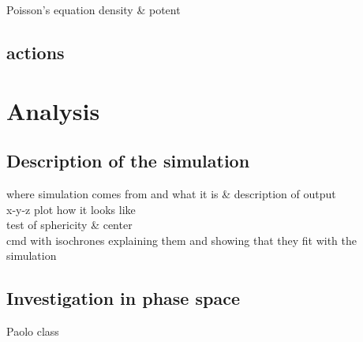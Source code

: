 \documentclass[a4paper,12pt,abstracton]{scrartcl}
\begin{document}
Poisson's equation
density \& potent
\subsection{actions}
\newpage
\section{Analysis}

\subsection{Description of the simulation}
where simulation comes from and what it is \& description of output\\
x-y-z plot how it looks like\\
test of sphericity \& center\\
cmd with isochrones explaining them and showing that they fit with the simulation\\

\subsection{Investigation in phase space}
Paolo class
\end{document}
